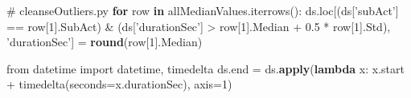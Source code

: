 \documentclass[11pt,]{article}
\newenvironment{Shaded}{\begin{snugshade}}{\end{snugshade}}
\newcommand{\BuiltInTok}[1]{\textcolor[rgb]{0.39,0.29,0.61}{\textbf{#1}}}
\newcommand{\CommentTok}[1]{\textcolor[rgb]{0.54,0.53,0.53}{#1}}
\newcommand{\ControlFlowTok}[1]{\textcolor[rgb]{0.12,0.11,0.11}{\textbf{#1}}}
\newcommand{\DecValTok}[1]{\textcolor[rgb]{0.69,0.50,0.00}{#1}}
\newcommand{\FloatTok}[1]{\textcolor[rgb]{0.69,0.50,0.00}{#1}}
\newcommand{\ImportTok}[1]{\textcolor[rgb]{1.00,0.33,0.00}{#1}}
\newcommand{\KeywordTok}[1]{\textcolor[rgb]{0.12,0.11,0.11}{\textbf{#1}}}
\newcommand{\NormalTok}[1]{\textcolor[rgb]{0.12,0.11,0.11}{#1}}
\newcommand{\OperatorTok}[1]{\textcolor[rgb]{0.12,0.11,0.11}{#1}}
\newcommand{\StringTok}[1]{\textcolor[rgb]{0.75,0.01,0.01}{#1}}
\begin{document}
\begin{Shaded}
\begin{Highlighting}[]
\CommentTok{# cleanseOutliers.py}
\ControlFlowTok{for}\NormalTok{ row }\KeywordTok{in}\NormalTok{ allMedianValues.iterrows():}
\NormalTok{    ds.loc[(ds[}\StringTok{'subAct'}\NormalTok{] }\OperatorTok{==}\NormalTok{ row[}\DecValTok{1}\NormalTok{].SubAct) }\OperatorTok{&}
\NormalTok{           (ds[}\StringTok{'durationSec'}\NormalTok{] }\OperatorTok{>}\NormalTok{ row[}\DecValTok{1}\NormalTok{].Median }\OperatorTok{+} \FloatTok{0.5} \OperatorTok{*}\NormalTok{ row[}\DecValTok{1}\NormalTok{].Std),}
           \StringTok{'durationSec'}\NormalTok{] }\OperatorTok{=} \BuiltInTok{round}\NormalTok{(row[}\DecValTok{1}\NormalTok{].Median)}

\ImportTok{from}\NormalTok{ datetime }\ImportTok{import}\NormalTok{ datetime, timedelta}
\NormalTok{ds.end }\OperatorTok{=}\NormalTok{ ds.}\BuiltInTok{apply}\NormalTok{(}\KeywordTok{lambda}\NormalTok{ x: x.start }\OperatorTok{+}\NormalTok{ timedelta(seconds}\OperatorTok{=}\NormalTok{x.durationSec), axis}\OperatorTok{=}\DecValTok{1}\NormalTok{)}
\end{Highlighting}
\end{Shaded}
\end{document}
